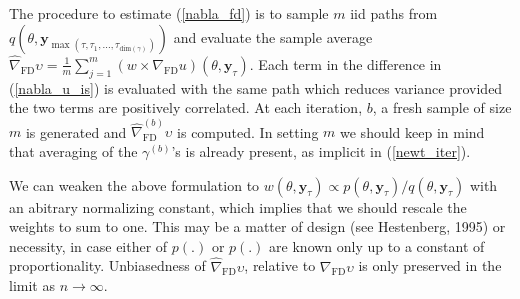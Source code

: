 \documentclass[11pt]{article}
\begin{document}
The procedure to estimate (\ref{nabla_fd}) is to sample $m$ iid paths from $q(\theta,\mathbf{y}_{\max(\tau,\tau_1,...,\tau_{\mathrm{dim}(\gamma)})})$ and evaluate the sample average $\widehat\nabla_{\mathrm{FD}}\upsilon=\frac{1}{m}\sum_{j=1}^m (w\times\nabla_{\mathrm{FD}}u)(\theta,\mathbf{y}_{\tau})$.
Each term in the difference in (\ref{nabla_u_is}) is evaluated with the same path which reduces variance provided the two terms are positively correlated. At each iteration, $b$, a fresh sample of size $m$ is generated and $\hat \nabla_{\mathrm{FD}}^{(b)}\upsilon$ is computed. In setting $m$ we should keep in mind that averaging of the $\gamma^{(b)}$'s is already present, as implicit in (\ref{newt_iter}). 

We can weaken the above formulation to $w(\theta,\mathbf{y}_{\tau}) \propto p(\theta,\mathbf{y}_\tau) / q(\theta,\mathbf{y}_\tau)$ with an abitrary normalizing constant, which implies that we should rescale the weights to sum to one.
This may be a matter of design (see Hestenberg, 1995) or necessity, in case either of $p(.)$ or $p(.)$ are known only up to a constant of proportionality.
Unbiasedness of $\hat \nabla_{\mathrm{FD}}\upsilon$, relative to $\nabla_{\mathrm{FD}}\upsilon$ is only preserved in the limit as $n\rightarrow \infty$.
\end{document}
